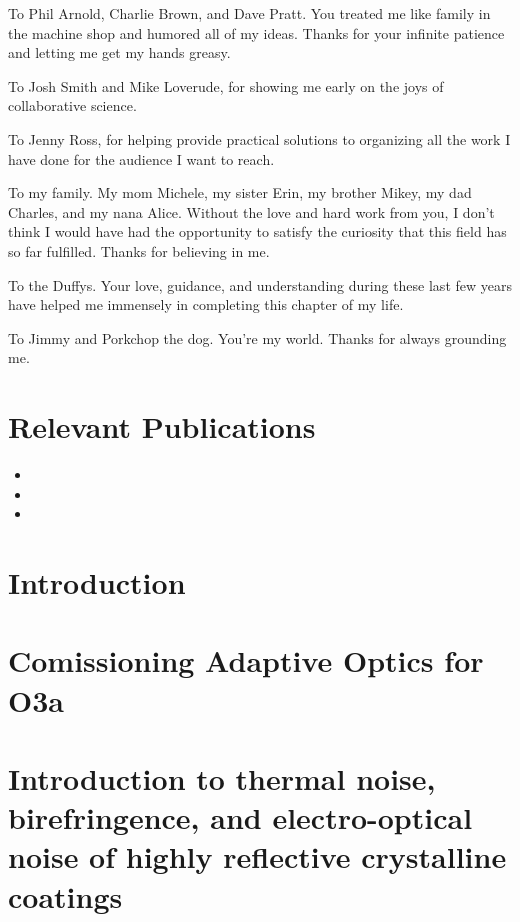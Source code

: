 \documentclass[12pt]{report}
\newif\ifswitch
\begin{document}
To Phil Arnold, Charlie Brown, and Dave Pratt. You treated me like family in the machine shop and humored all of my ideas. Thanks for your infinite patience and letting me get my hands greasy.

To Josh Smith and Mike Loverude, for showing me early on the joys of collaborative science.

To Jenny Ross, for helping provide practical solutions to organizing all the work I have done for the audience I want to reach. 

To my family. My mom Michele, my sister Erin, my brother Mikey, my dad Charles, and my nana Alice. Without the love and hard work from you, I don’t think I would have had the opportunity to satisfy the curiosity that this field has so far fulfilled. Thanks for believing in me.

To the Duffys. Your love, guidance, and understanding during these last few years have helped me immensely in completing this chapter of my life.

To Jimmy and Porkchop the dog. You’re my world. Thanks for always grounding me.

\ifswitch
    \nobibliography*
    \chapter*{Relevant Publications}
    \begin{itemize}
        \item {}
        \item {}
        \item {}
    \end{itemize}


\tableofcontents


\chapter{Introduction}

\newpage

\chapter{Comissioning Adaptive Optics for O3a}

\newpage

\chapter{Introduction to thermal noise, birefringence, and electro-optical noise of highly reflective crystalline coatings}

\newpage 
\end{document}
